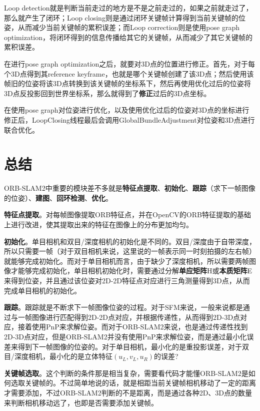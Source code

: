 Loop detection就是判断当前走过的地方是不是之前走过的，如果之前就走过了，那么就产生了闭环；Loop closing则是通过闭环关键帧计算得到当前关键帧的位姿，从而减少当前关键帧的累积误差；而Loop correction则是使用pose graph optimization，将闭环得到的信息传播给其它的关键帧，从而减少了其它关键帧的累积误差。



在进行pose graph optimization之后，就要对3D点的位置进行修正。首先，对于每个3D点得到其reference keyframe，也就是哪个关键帧创建了该3D点；然后使用该帧旧的位姿将该3D点转换到该关键帧的坐标系下，然后再使用优化过后的位姿将3D点反投影回到世界坐标系，那么就得到了\textbf{修正}过后的3D点坐标。

在使用pose graph对位姿进行优化，以及使用优化过后的位姿对3D点的坐标进行修正后，LoopClosing线程最后会调用GlobalBundleAdjustment对位姿和3D点进行联合优化。



\section{总结}
ORB-SLAM2中重要的模块差不多就是\textbf{特征点提取}、\textbf{初始化}、\textbf{跟踪}（求下一帧图像的位姿）、\textbf{建图}、\textbf{回环检测}、\textbf{优化}。

\textbf{特征点提取}。对每帧图像提取ORB特征点，并在OpenCV的ORB特征提取的基础上进行改进，使其提取出来的特征在图像上的分布更加均匀。

\textbf{初始化}。单目相机和双目/深度相机的初始化是不同的。双目/深度由于自带深度，所以只需要一帧（对于双目相机来说，这里说的一帧表示同一时刻拍摄的左右帧）就能够完成初始化。而对于单目相机而言，由于缺少了深度相机，所以需要两帧图像才能够完成初始化，单目相机初始化时，需要通过分解\textbf{单应矩阵}H或\textbf{本质矩阵}E来得到位姿，并且通过该位姿对2D-2D特征点对应进行三角测量得到3D点，从而完成单目相机的初始化。

\textbf{跟踪}。跟踪就是不断求下一帧图像位姿的过程。对于SFM来说，一般来说都是通过与一帧图像进行匹配得到2D-2D点对应，并根据传递性，从而得到2D-3D点对应，接着使用PnP来求解位姿。而对于ORB-SLAM2来说，也是通过传递性找到2D-3D点对应，但是ORB-SLAM2并没有使用PnP来求解位姿，而是通过最小化误差来得到下一帧图像的位姿的。对于单目相机，最小化的是重投影误差，对于双目/深度相机，最小化的是立体特征$(u_L, v_L, u_R)$的误差?

\textbf{关键帧选取}。这个判断的条件那是相当复杂，需要看代码才能懂ORB-SLAM2是如何选取关键帧的。不过简单地说的话，就是相距当前关键帧相机移动了一定的距离才需要添加，不过ORB-SLAM2判断的不是距离，而是通过各种2D、3D点的数量来判断相机移动远了，也即是否需要添加关键帧。

